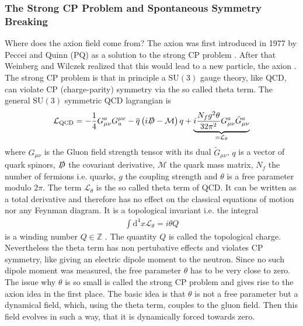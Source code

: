 \documentclass[twoside,a4paper, 12pt]{article}
\newcommand{\diff}{\mathrm{d}}
\numberwithin{equation}{section}
\begin{document}
\subsubsection{The Strong CP Problem and Spontaneous Symmetry Breaking}
Where does the axion field come from?
The axion was first introduced in 1977
by Peccei and Quinn (PQ) as a solution to the strong CP problem \cite{PQ1} \cite{PQ2}.
After that Weinberg and Wilczek realized that this would lead to a new particle, the axion \cite{Weinberg:1977ma} \cite{Wilczek:1977pj}.
The strong CP problem is that in principle a $\mathrm{SU}(3)$ gauge theory, like QCD, can violate CP (charge-parity)
symmetry via the so called theta term.
The general $\mathrm{SU}(3)$ symmetric QCD lagrangian is \cite[Chap. VII.3, Page 369]{Nutshell}
\begin{align}
    \label{eq:L_qcd}
    \mathcal{L}_\mathrm{QCD} = - \frac{1}{4} G^a_{\mu \nu} G^{\mu \nu}_a - \overline{q} \left( i \slashed{D} - \mathcal{M} \right) q + \underbrace{i \frac{N_f g^2 \theta}{32 \pi^2} G_{\mu \nu}^a \tilde{G}_{\mu \nu}^a}_{= \mathcal{L}_\theta}
\end{align}
where $G_{\mu \nu}$ is the Gluon field strength tensor with its dual $\tilde{G}_{\mu \nu}$, $q$ is a vector of quark spinors,
$\slashed{D}$ the covariant derivative, $\mathcal{M}$ the quark mass matrix,
$N_f$ the number of fermions i.e. quarks, $g$ the coupling strength and $\theta$ is a free parameter modulo $2\pi$.
The term $\mathcal{L}_\theta$ is the so called theta term of QCD. It can be written as a total derivative and therefore has no effect on the classical equations of motion nor any Feynman diagram.
It is a topological invariant i.e. the integral
\begin{align*}
    \int \diff^4 x \mathcal{L}_\theta = i \theta Q
\end{align*}
is a winding number $Q \in \mathbb{Z}$ \cite[Sec. II, Eq. 2.6]{Leutwyler:1992yt}. The quantity $Q$ is called the topological charge.
Nevertheless the theta term has non pertubative effects and violates CP symmetry, like giving an electric dipole moment to the neutron. Since no such dipole moment was measured, the free parameter $\theta$
has to be very close to zero. The issue why $\theta$ is so small is called the strong CP problem and gives rise to the axion idea in the first place. The basic idea is that $\theta$ is not a free parameter
but a dynamical field, which, using the theta term, couples to the gluon field.
Then this field evolves in such a way, that it is dynamically forced towards zero.
\end{document}
